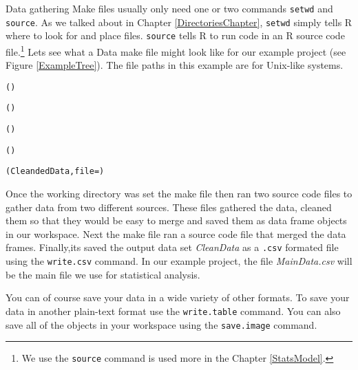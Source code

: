Data gathering Make files usually only need one or two commands {\tt{setwd}} and {\tt{source}}. As we talked about in Chapter \ref{DirectoriesChapter}, {\tt{setwd}} simply tells R where to look for and place files. {\tt{source}} tells R to run code in an R source code file.\footnote{We use the {\tt{source}} command is used more in the Chapter \ref{StatsModel}.}  Lets see what a Data make file might look like for our example project (see Figure \ref{ExampleTree}). The file paths in this example are for Unix-like systems.

\begin{knitrout}
\color{fgcolor}\begin{kframe}
\begin{alltt}
()

()

()

()

(CleandedData, file = )
\end{alltt}
\end{kframe}
\end{knitrout}


Once the working directory was set the make file then ran two source code files to gather data from two different sources. These files gathered the data, cleaned them so that they would be easy to merge and saved them as data frame objects in our workspace. Next the make file ran a source code file that merged the data frames. Finally,its saved the output data set {\emph{CleanData}} as a \texttt{.csv} formated file using the {\tt{write.csv}} command. In our example project, the file {\emph{MainData.csv}} will be the main file we use for statistical analysis. 

You can of course save your data in a wide variety of other formats. To save your data in another plain-text format use the \texttt{write.table} command. You can also save all of the objects in your workspace using the \texttt{save.image} command.

